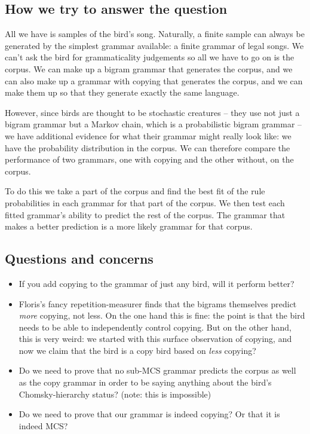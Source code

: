 \documentclass[12pt]{article}
\theoremstyle{definition}
\begin{document}
\subsection{How we try to answer the question}
\label{sec:how-we-try}

All we have is samples of the bird's song. Naturally, a finite sample can always be generated by the simplest grammar available: a finite grammar of legal songs. We can't ask the bird for grammaticality judgements so all we have to go on is the corpus. We can make up a bigram grammar that generates the corpus, and we can also make up a grammar with copying that generates the corpus, and we can make them up so that they generate exactly the same language.

However, since birds are thought to be stochastic creatures -- they use not just a bigram grammar but a Markov chain, which is a probabilistic bigram grammar -- we have additional evidence for what their grammar might really look like: we have the probability distribution in the corpus. We can therefore compare the performance of two grammars, one with copying and the other without, on the corpus. 

To do this we take a part of the corpus and find the best fit of the rule probabilities in each grammar for that part of the corpus. We then test each fitted grammar's ability to predict the rest of the corpus. The grammar that makes a better prediction is a more likely grammar for that corpus.

\subsection{Questions and concerns}
\label{sec:questions-concerns}

\begin{itemize}
\item If you add copying to the grammar of just any bird, will it perform better?
\item Floris's fancy repetition-measurer finds that the bigrams themselves predict \textit{more} copying, not less. On the one hand this is fine: the point is that the bird needs to be able to independently control copying. But on the other hand, this is very weird: we started with this surface observation of copying, and now we claim that the bird is a copy bird based on \textit{less} copying?
\item Do we need to prove that no sub-MCS grammar predicts the corpus as well as the copy grammar in order to be saying anything about the bird's Chomsky-hierarchy status? (note: this is impossible)
\item Do we need to prove that our grammar is indeed copying? Or that it is indeed MCS?
\end{itemize}
\end{document}
